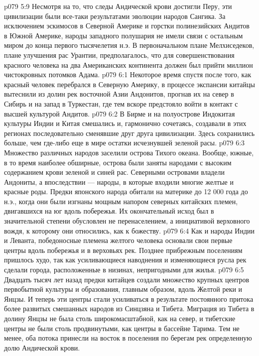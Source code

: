 \vs p079 5:9 Несмотря на то, что следы Андической крови достигли Перу, эти цивилизации были все\hyp{}таки результатами эволюции народов Сангика. За исключением эскимосов в Северной Америке и горстки полинезийских Андитов в Южной Америке, народы западного полушария не имели связи с остальным миром до конца первого тысячелетия н.э. В первоначальном плане Мелхиседеков, плане улучшения рас Урантии, предполагалось, что для совершенствования красного человека на два Американских континента должен был прийти миллион чистокровных потомков Адама.
\vs p079 6:1 Некоторое время спустя после того, как красный человек перебрался в Северную Америку, в процессе экспансии китайцы вытеснили из долин рек восточной Азии Андонитов, прогнав их на север в Сибирь и на запад в Туркестан, где тем вскоре предстояло войти в контакт с высшей культурой Андитов.
\vs p079 6:2 В Бирме и на полуострове Индокитая культуры Индии и Китая смешались и, гармонично сочетаясь, создавали в этих регионах последовательно сменявшие друг друга цивилизации. Здесь сохранились больше, чем где\hyp{}либо еще в мире остатки исчезнувшей зеленой расы.
\vs p079 6:3 Множество различных народов заселили острова Тихого океана. Вообще, южные, в то время наиболее обширные, острова были заняты народами с высоким содержанием крови зеленой и синей рас. Северными островами владели Андониты, а впоследствии --- народы, в которые входили многие желтые и красные роды. Предки японского народа обитали на материке до 12 000 года до н.э., когда они были изгнаны мощным напором северных китайских племен, двигавшихся на юг вдоль побережья. Их окончательный исход был в значительной степени обусловлен не перенаселением, а инициативой верховного вождя, к которому они относились, как к божеству.
\vs p079 6:4 Как и народы Индии и Леванта, победоносные племена желтого человека основали свои первые центры вдоль побережья и в верховьях рек. Позднее прибрежным поселениям пришлось худо, так как усиливающиеся наводнения и изменяющиеся русла рек сделали города, расположенные в низинах, непригодными для жилья.
\vs p079 6:5 Двадцать тысяч лет назад предки китайцев создали множество крупных центров первобытной культуры и образования, главным образом, вдоль Желтой реки и Янцзы. И теперь эти центры стали усиливаться в результате постоянного притока более развитых смешанных народов из Синцзяна и Тибета. Миграция из Тибета в долину Янцзы не была столь широкомасштабной, как на север, и тибетские центры не были столь продвинутыми, как центры в бассейне Тарима. Тем не менее, оба потока принесли на восток в поселения по берегам рек определенную долю Андической крови.

